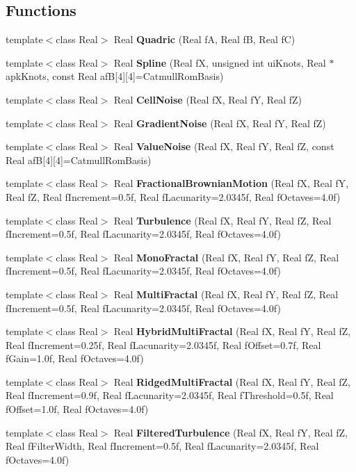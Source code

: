 \subsection*{Functions}
\begin{CompactItemize}
\item 
template$<$class Real$>$ Real {\bf Quadric} (Real f\-A, Real f\-B, Real f\-C)
\item 
template$<$class Real$>$ Real {\bf Spline} (Real f\-X, unsigned int ui\-Knots, Real $\ast$apk\-Knots, const Real af\-B[4][4]=Catmull\-Rom\-Basis)
\item 
template$<$class Real$>$ Real {\bf Cell\-Noise} (Real f\-X, Real f\-Y, Real f\-Z)
\item 
template$<$class Real$>$ Real {\bf Gradient\-Noise} (Real f\-X, Real f\-Y, Real f\-Z)
\item 
template$<$class Real$>$ Real {\bf Value\-Noise} (Real f\-X, Real f\-Y, Real f\-Z, const Real af\-B[4][4]=Catmull\-Rom\-Basis)
\item 
template$<$class Real$>$ Real {\bf Fractional\-Brownian\-Motion} (Real f\-X, Real f\-Y, Real f\-Z, Real f\-Increment=0.5f, Real f\-Lacunarity=2.0345f, Real f\-Octaves=4.0f)
\item 
template$<$class Real$>$ Real {\bf Turbulence} (Real f\-X, Real f\-Y, Real f\-Z, Real f\-Increment=0.5f, Real f\-Lacunarity=2.0345f, Real f\-Octaves=4.0f)
\item 
template$<$class Real$>$ Real {\bf Mono\-Fractal} (Real f\-X, Real f\-Y, Real f\-Z, Real f\-Increment=0.5f, Real f\-Lacunarity=2.0345f, Real f\-Octaves=4.0f)
\item 
template$<$class Real$>$ Real {\bf Multi\-Fractal} (Real f\-X, Real f\-Y, Real f\-Z, Real f\-Increment=0.5f, Real f\-Lacunarity=2.0345f, Real f\-Octaves=4.0f)
\item 
template$<$class Real$>$ Real {\bf Hybrid\-Multi\-Fractal} (Real f\-X, Real f\-Y, Real f\-Z, Real f\-Increment=0.25f, Real f\-Lacunarity=2.0345f, Real f\-Offset=0.7f, Real f\-Gain=1.0f, Real f\-Octaves=4.0f)
\item 
template$<$class Real$>$ Real {\bf Ridged\-Multi\-Fractal} (Real f\-X, Real f\-Y, Real f\-Z, Real f\-Increment=0.9f, Real f\-Lacunarity=2.0345f, Real f\-Threshold=0.5f, Real f\-Offset=1.0f, Real f\-Octaves=4.0f)
\item 
template$<$class Real$>$ Real {\bf Filtered\-Turbulence} (Real f\-X, Real f\-Y, Real f\-Z, Real f\-Filter\-Width, Real f\-Increment=0.5f, Real f\-Lacunarity=2.0345f, Real f\-Octaves=4.0f)
\item 

\end{CompactItemize}
